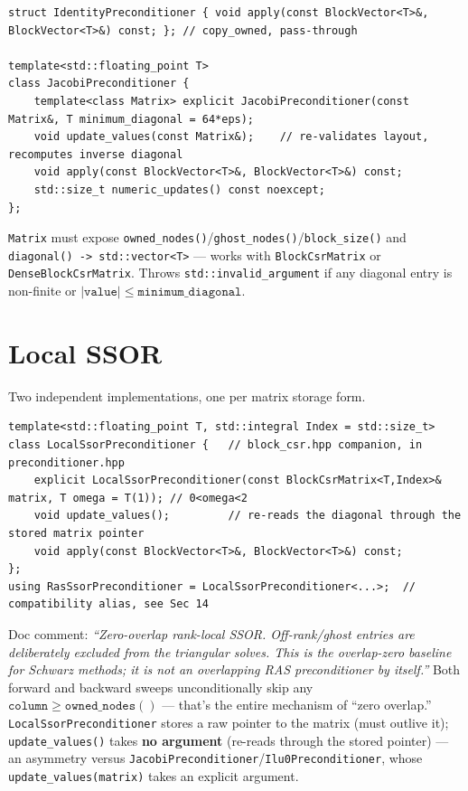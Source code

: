 \documentclass[11pt,a4paper]{report}
\begin{document}
\begin{lstlisting}
struct IdentityPreconditioner { void apply(const BlockVector<T>&, BlockVector<T>&) const; }; // copy_owned, pass-through

template<std::floating_point T>
class JacobiPreconditioner {
    template<class Matrix> explicit JacobiPreconditioner(const Matrix&, T minimum_diagonal = 64*eps);
    void update_values(const Matrix&);    // re-validates layout, recomputes inverse diagonal
    void apply(const BlockVector<T>&, BlockVector<T>&) const;
    std::size_t numeric_updates() const noexcept;
};
\end{lstlisting}

\lstinline!Matrix! must expose \lstinline!owned_nodes()!/\lstinline!ghost_nodes()!/\lstinline!block_size()!
and \lstinline!diagonal() -> std::vector<T>! --- works with \lstinline!BlockCsrMatrix!
or \lstinline!DenseBlockCsrMatrix!. Throws \lstinline!std::invalid_argument! if any
diagonal entry is non-finite or $|\mathtt{value}| \leq \mathtt{minimum\_diagonal}$.

\section{Local SSOR}
\label{sec:6.2}

Two independent implementations, one per matrix storage form.

\begin{lstlisting}
template<std::floating_point T, std::integral Index = std::size_t>
class LocalSsorPreconditioner {   // block_csr.hpp companion, in preconditioner.hpp
    explicit LocalSsorPreconditioner(const BlockCsrMatrix<T,Index>& matrix, T omega = T(1)); // 0<omega<2
    void update_values();         // re-reads the diagonal through the stored matrix pointer
    void apply(const BlockVector<T>&, BlockVector<T>&) const;
};
using RasSsorPreconditioner = LocalSsorPreconditioner<...>;  // compatibility alias, see Sec 14
\end{lstlisting}

Doc comment: \emph{``Zero-overlap rank-local SSOR. Off-rank/ghost
entries are deliberately excluded from the triangular solves. This is
the overlap-zero baseline for Schwarz methods; it is not an overlapping
RAS preconditioner by itself.''} Both forward and backward sweeps
unconditionally skip any $\mathtt{column} \geq \mathtt{owned\_nodes()}$
--- that's the entire mechanism of ``zero overlap.''
\lstinline!LocalSsorPreconditioner! stores a raw pointer to the matrix (must
outlive it); \lstinline!update_values()! takes \textbf{no argument} (re-reads
through the stored pointer) --- an asymmetry versus
\lstinline!JacobiPreconditioner!/\lstinline!Ilu0Preconditioner!, whose
\lstinline!update_values(matrix)! takes an explicit argument.
\end{document}
